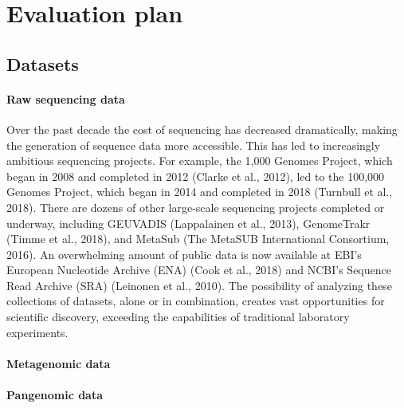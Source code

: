 \section{Evaluation plan}

\subsection{Datasets}

\paragraph{Raw sequencing data}
Over the past decade the cost of sequencing has decreased dramatically, making the generation of sequence data more accessible. This has led to increasingly ambitious sequencing projects. For example, the 1,000 Genomes Project, which began in
2008 and completed in 2012 (Clarke et al., 2012), led to the 100,000 Genomes Project, which began in 2014 and completed
in 2018 (Turnbull et al., 2018). There are dozens of other large-scale sequencing projects completed or underway, including
GEUVADIS (Lappalainen et al., 2013), GenomeTrakr (Timme et al., 2018), and MetaSub (The MetaSUB International Consortium, 2016). An overwhelming amount of public data is now available at EBI’s European Nucleotide Archive (ENA) (Cook
et al., 2018) and NCBI’s Sequence Read Archive (SRA) (Leinonen et al., 2010). The possibility of analyzing these collections
of datasets, alone or in combination, creates vast opportunities for scientific discovery, exceeding the capabilities of traditional
laboratory experiments.

\paragraph{Metagenomic data}

\paragraph{Pangenomic data}


